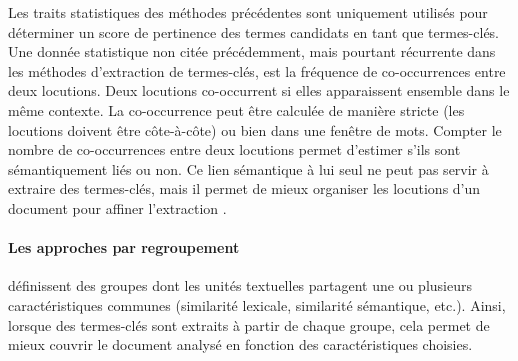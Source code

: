         Les traits statistiques des méthodes précédentes sont uniquement utilisés
        pour déterminer un score de pertinence des termes candidats en tant que
        termes-clés. Une donnée statistique non citée précédemment, mais pourtant
        récurrente dans les méthodes d'extraction de termes-clés, est la fréquence
        de co-occurrences entre deux locutions. Deux locutions
        co-occurrent si elles apparaissent ensemble dans le même contexte. La
        co-occurrence peut être calculée de manière stricte (les locutions doivent
        être côte-à-côte) ou bien dans une fenêtre de mots. Compter le nombre de
        co-occurrences entre deux locutions permet d'estimer s'ils sont
        sémantiquement liés ou non. Ce lien sémantique à lui seul ne peut pas
        servir à extraire des termes-clés, mais il permet de mieux organiser les
        locutions d'un document pour affiner l'extraction
        \citep{matsuo2004wordcooccurrence, liu2009keycluster,
        mihalcea2004textrank}.

      \paragraph{Les approches par regroupement}
        définissent des groupes dont les unités textuelles partagent une ou
        plusieurs caractéristiques communes (similarité lexicale, similarité sémantique,
        etc.). Ainsi, lorsque des termes-clés sont extraits à partir de chaque
        groupe, cela permet de mieux couvrir le document analysé en fonction des
        caractéristiques choisies.

